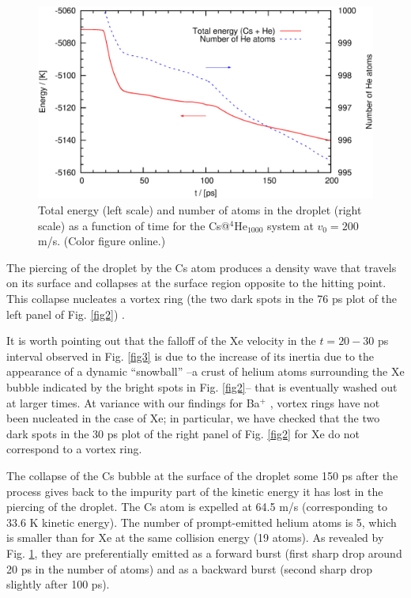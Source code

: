  
\begin{figure}[!]
\centerline{\includegraphics[width=0.90\linewidth,clip]{fig5}}
\caption{\label{fig5} 
Total energy  (left scale) and number of atoms in the droplet (right scale) as a function of time for the 
Cs@$^4$He$_{1000}$ system at $v_0 = 200$ m/s. (Color figure online.)
}
\end{figure}

 
 The piercing of the droplet by the Cs atom produces a density wave that travels on its surface and collapses at the surface region opposite to the hitting point.
 This collapse nucleates a 
 vortex ring (the two dark spots in the 76 ps plot of the left panel of Fig. \ref{fig2}) \cite{Lea14}.
 
 It is worth pointing out that the falloff of the Xe velocity in the $t=20-30$ ps interval observed in Fig. \ref{fig3}  is due to the increase of its inertia
due to the appearance of a dynamic ``snowball''  --a crust of helium atoms surrounding the Xe bubble indicated by the bright spots in 
Fig. \ref{fig2}-- that is eventually washed out at larger times.
At variance with our findings for Ba$^+$ \cite{Mat14}, vortex rings have not been nucleated in the case of Xe; in particular, we have checked that the two dark spots  in the 30 ps plot of the right panel of Fig. \ref{fig2} for Xe do not correspond to a vortex ring. 

The collapse of the Cs bubble at the surface of the droplet some 150 ps after the process 
 gives back to the impurity part of the kinetic energy it has lost  in the 
 piercing of the droplet. The Cs atom is expelled at 64.5 m/s (corresponding to 33.6 K kinetic energy). 
The number of prompt-emitted helium atoms is 5, which is smaller than for Xe at the same collision energy (19 atoms).
As revealed by Fig. \ref{fig5}, they are  preferentially emitted as a forward  burst  (first sharp drop around 20 ps in the number of atoms) and as a 
backward burst  (second sharp drop slightly after 100 ps).